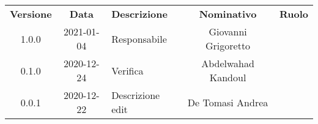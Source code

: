 {
    \renewcommand{\arraystretch}{1.5}
    \centering
    \begin{longtable}{ c c  C{4cm}  c  c }
        \rowcolor{\primaryColor}
        \textcolor{\secondaryColor}{
        \textbf{Versione}}     & \textcolor{\secondaryColor}{\textbf{Data}}       & \textcolor{\secondaryColor}
        {\textbf{Descrizione}} & \textcolor{\secondaryColor}{\textbf{Nominativo}} & \textcolor{\secondaryColor}{\textbf{Ruolo}}                          \\


        1.0.0                  & 2021-01-04                                       & Responsabile                                & Giovanni Grigoretto & \responsabile{} \\
        0.1.0                  & 2020-12-24                                       & Verifica                                    & Abdelwahad Kandoul & \verificatore{} \\
        0.0.1                  & 2020-12-22                                       & Descrizione edit                            & De Tomasi Andrea & \analista{}    \\
    \end{longtable}
}